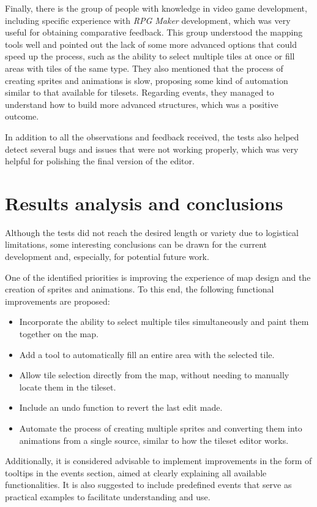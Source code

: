 \medskip

Finally, there is the group of people with knowledge in video game development, including specific experience with \textit{RPG Maker} development, which was very useful for obtaining comparative feedback. This group understood the mapping tools well and pointed out the lack of some more advanced options that could speed up the process, such as the ability to select multiple tiles at once or fill areas with tiles of the same type. They also mentioned that the process of creating sprites and animations is slow, proposing some kind of automation similar to that available for tilesets. Regarding events, they managed to understand how to build more advanced structures, which was a positive outcome.

\medskip

In addition to all the observations and feedback received, the tests also helped detect several bugs and issues that were not working properly, which was very helpful for polishing the final version of the editor.

\section*{Results analysis and conclusions}
Although the tests did not reach the desired length or variety due to logistical limitations, some interesting conclusions can be drawn for the current development and, especially, for potential future work.

\smallskip

One of the identified priorities is improving the experience of map design and the creation of sprites and animations. To this end, the following functional improvements are proposed:

\begin{itemize}
	\item Incorporate the ability to select multiple tiles simultaneously and paint them together on the map.
	\item Add a tool to automatically fill an entire area with the selected tile.
	\item Allow tile selection directly from the map, without needing to manually locate them in the tileset.
	\item Include an undo function to revert the last edit made.
	\item Automate the process of creating multiple sprites and converting them into animations from a single source, similar to how the tileset editor works.
\end{itemize}

Additionally, it is considered advisable to implement improvements in the form of tooltips in the events section, aimed at clearly explaining all available functionalities. It is also suggested to include predefined events that serve as practical examples to facilitate understanding and use.
